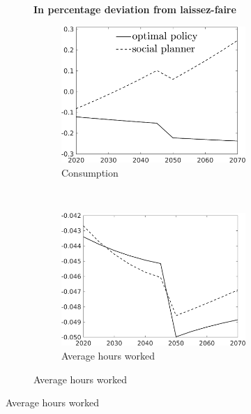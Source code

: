 \begin{figure}[h!!!]
	\centering \caption{Efficient and optimal allocation relative to laissez-faire}
\label{fig:optAll_percLf_dyn}
	\begin{subfigure}[]{1\textwidth}	
		\centering\footnotesize{\textbf{In percentage deviation from laissez-faire}}\\ \vspace{2mm}
	\begin{subfigure}[]{0.4\textwidth}
		\caption{Consumption}
		\includegraphics[width=1\textwidth]{../../codding_model/own_basedOnFried/optimalPol_010922_revision/figures/all_13Sept22_Tplus30/C_PercentageLFDyn_Target_regime4_knspil0_spillover0_noskill0_sep0_xgrowth0_PV1_etaa0.79_lgd1.png}
	\end{subfigure}
\begin{minipage}[]{0.1\textwidth}
	\ 
\end{minipage}
	\begin{subfigure}[]{0.4\textwidth}
				\caption{Average hours worked }
		\includegraphics[width=1\textwidth]{../../codding_model/own_basedOnFried/optimalPol_010922_revision/figures/all_13Sept22_Tplus30/Hagg_PercentageLFDyn_Target_regime4_knspil0_spillover0_noskill0_sep0_xgrowth0_PV1_etaa0.79_lgd0.png}
	\end{subfigure}


\end{subfigure}
\end{figure}
